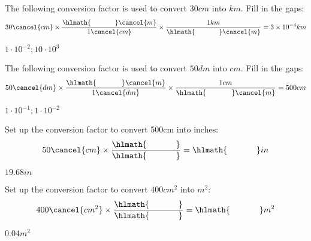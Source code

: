\documentclass[main.tex]{subfiles}
\begin{document}
\begin{multicols*}{2}
\begin{question}[ID=21]
The following conversion factor is used to convert $30 cm$ into $km$. Fill in the gaps:
\[30\cancel{cm} \times \dfrac{  \hlmath{\hspace{35pt}}\cancel{m}}{1\cancel{cm}}   \times \dfrac{1km}{ \hlmath{\hspace{35pt}}\cancel{m}}       =3\times 10^{-4}km\]
\end{question}
\begin{solution}
$1\cdot 10^{-2};10\cdot 10^{3} $
\hspace{0.1cm}\end{solution}%

\begin{question}[ID=\the\value{numA}]
The following conversion factor is used to convert $50 dm$ into $cm$. Fill in the gaps:
\[50\cancel{dm} \times \dfrac{ \hlmath{\hspace{35pt}} \cancel{m}}{1\cancel{dm}}   \times \dfrac{1cm}{\hlmath{\hspace{35pt}}\cancel{m}}       = 500cm\]
\end{question}
\begin{solution}
$1\cdot 10^{-1};1\cdot 10^{-2} $
\hspace{0.1cm}\end{solution}%
%
\begin{question}[ID=23]
Set up the conversion factor to convert 500cm into inches:
\[50\cancel{cm} \times \dfrac{\hlmath{\hspace{35pt}} }{\hlmath{\hspace{35pt}}}=\hlmath{\hspace{35pt}}in\]
\end{question}
\begin{solution}
$19.68in$
\hspace{0.1cm}\end{solution}%

\begin{question}[ID=\the\value{numA}]
Set up the conversion factor to convert $400cm^2$ into $m^2$:
\[400\cancel{cm^2} \times \dfrac{\hlmath{\hspace{35pt}} }{\hlmath{\hspace{35pt}}}=\hlmath{\hspace{35pt}}m^2\]
\end{question}
\begin{solution}
$0.04m^2$
\hspace{0.1cm}\end{solution}%
%
%


\end{multicols*}
\end{document}
